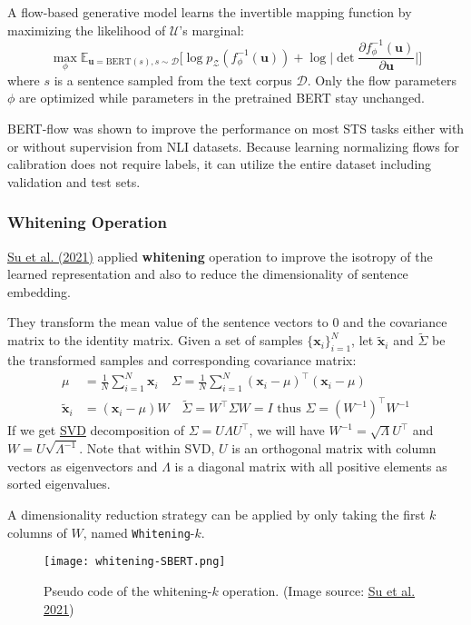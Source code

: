 \documentclass[12pt]{article}
\begin{document}
A flow-based generative model learns the invertible mapping function by maximizing the likelihood of $\mathcal{U}$'s marginal:
\[
\max_\phi\mathbb{E}_{\mathbf{u}=\text{BERT}(s), s\sim\mathcal{D}} \Big[ \log p_\mathcal{Z}(f^{-1}_\phi(\mathbf{u})) + \log\big\vert\det\frac{\partial f^{-1}_\phi(\mathbf{u})}{\partial\mathbf{u}}\big\vert \Big]
\]
where $s$ is a sentence sampled from the text corpus $\mathcal{D}$. Only the flow parameters $\phi$ are optimized while parameters in the pretrained BERT stay unchanged.

BERT-flow was shown to improve the performance on most STS tasks either with or without supervision from NLI datasets. Because learning normalizing flows for calibration does not require labels, it can utilize the entire dataset including validation and test sets.

\subsubsection{Whitening Operation}
\href{https://arxiv.org/abs/2103.15316}{Su et al. (2021)} applied \textbf{whitening} operation to improve the isotropy of the learned representation and also to reduce the dimensionality of sentence embedding.

They transform the mean value of the sentence vectors to 0 and the covariance matrix to the identity matrix. Given a set of samples $\{\mathbf{x}_i\}_{i=1}^N$, let $\tilde{\mathbf{x}}_i$ and $\tilde{\Sigma}$ be the transformed samples and corresponding covariance matrix:
\[
\begin{aligned}
\mu &= \frac{1}{N}\sum_{i=1}^N \mathbf{x}_i \quad \Sigma = \frac{1}{N}\sum_{i=1}^N (\mathbf{x}_i - \mu)^\top (\mathbf{x}_i - \mu) \\
\tilde{\mathbf{x}}_i &= (\mathbf{x}_i - \mu)W \quad \tilde{\Sigma} = W^\top\Sigma W = I \text{ thus } \Sigma = (W^{-1})^\top W^{-1}
\end{aligned}
\]
If we get \href{https://en.wikipedia.org/wiki/Singular_value_decomposition}{SVD} decomposition of $\Sigma = U\Lambda U^\top$, we will have $W^{-1}=\sqrt{\Lambda} U^\top$ and  $W=U\sqrt{\Lambda^{-1}}$. Note that within SVD, $U$ is an orthogonal matrix with column vectors as eigenvectors and $\Lambda$ is a diagonal matrix with all positive elements as sorted eigenvalues.

A dimensionality reduction strategy can be applied by only taking the first $k$ columns of $W$, named \texttt{Whitening}-$k$.

\begin{figure}[H]
    \centering
    \texttt{[image: whitening-SBERT.png]}
    \caption{Pseudo code of the whitening-$k$ operation. (Image source: \href{https://arxiv.org/abs/2103.15316}{Su et al. 2021})}
\end{figure}
\end{document}
